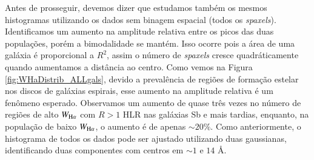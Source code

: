
Antes de prosseguir, devemos dizer que estudamos também os mesmos histogramas utilizando os dados sem binagem espacial (todos os {\em spaxels}). Identificamos um aumento na amplitude relativa entre os picos das duas populações, porém a bimodalidade se mantém. Isso ocorre pois a área de uma galáxia é proporcional a $R^2$, assim o número de {\em spaxels} cresce quadráticamente quando aumentamos a distância ao centro. Como vemos na Figura \ref{fig:WHaDistrib_ALLgals}, devido a prevalência de regiões de formação estelar nos discos de galáxias espirais, esse aumento na amplitude relativa é um fenômeno esperado. Observamos um aumento de quase três vezes no número de regiões de alto $W_{\Ha}$ com $R > 1$ HLR nas galáxias Sb e mais tardias, enquanto, na população de baixo $W_{\Ha}$, o aumento é de apenas $\sim 20\%$. Como anteriormente, o histograma de todos os dados pode ser ajustado utilizando duas gaussianas, identificando duas componentes com centros em $\sim 1$ e $14$ \AA.


